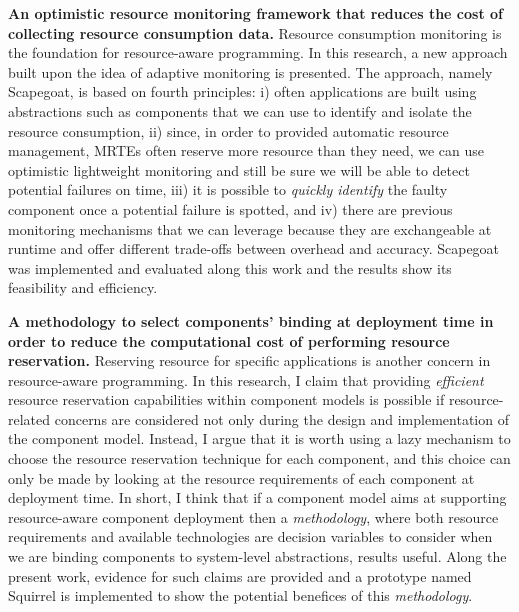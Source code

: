\textbf{An optimistic resource monitoring framework that reduces the cost of collecting resource consumption data.}
Resource consumption monitoring is the foundation for resource-aware programming.
In this research, a new approach built upon the idea of adaptive monitoring is presented.
The approach, namely Scapegoat, is based on fourth principles: i) often applications are built using abstractions such as components that we can use to identify and isolate the resource consumption, ii) since, in order to provided automatic resource management, MRTEs often reserve more resource than they need, we can use optimistic lightweight monitoring and still be sure we will be able to detect potential failures on time, iii) it is possible to \textit{quickly identify} the faulty component once a potential failure is spotted, and iv) there are previous monitoring mechanisms that we can leverage because they are exchangeable at runtime and offer different trade-offs between overhead and accuracy.
Scapegoat was implemented and evaluated along this work and the results show its feasibility and efficiency.

\textbf{A methodology to select components' binding at deployment time in order to reduce the computational cost of performing resource reservation.}
Reserving resource for specific applications is another concern in resource-aware programming.
In this research, I claim that providing \textit{efficient} resource reservation capabilities within component models is possible if resource-related concerns are considered not only during the design and implementation of the component model.
Instead, I argue that it is worth using a lazy mechanism to choose the resource reservation technique for each component, and this choice can only be made by looking at the resource requirements of each component at deployment time.
In short, I think that if a component model aims at supporting resource-aware component deployment then a \textit{methodology}, where both resource requirements and available technologies are decision variables to consider when we are binding components to system-level abstractions, results useful.
Along the present work, evidence for such claims are provided and a prototype named Squirrel is implemented to show the potential benefices of this \textit{methodology}.

